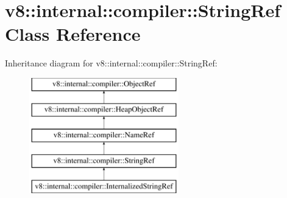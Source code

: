 \hypertarget{classv8_1_1internal_1_1compiler_1_1StringRef}{}\section{v8\+:\+:internal\+:\+:compiler\+:\+:String\+Ref Class Reference}
\label{classv8_1_1internal_1_1compiler_1_1StringRef}
Inheritance diagram for v8\+:\+:internal\+:\+:compiler\+:\+:String\+Ref\+:\begin{figure}[H]
\begin{center}
\leavevmode
\includegraphics[height=5.000000cm]{classv8_1_1internal_1_1compiler_1_1StringRef}
\end{center}
\end{figure}
